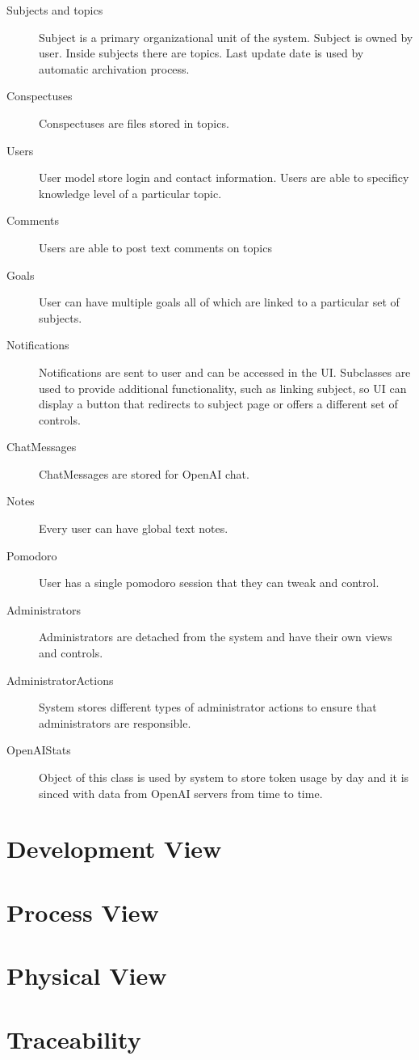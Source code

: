 \documentclass[
    english, %
]{VUMIFPSkursinis}
\begin{document}
\begin{description}
    \item[Subjects and topics] Subject is a primary organizational unit of the system. Subject is owned by user. Inside subjects there are topics. Last update date is used by automatic archivation process.
    \item[Conspectuses] Conspectuses are files stored in topics.
    \item[Users] User model store login and contact information. Users are able to specificy knowledge level of a particular topic.
    \item[Comments] Users are able to post text comments on topics
    \item[Goals] User can have multiple goals all of which are linked to a particular set of subjects.
    \item[Notifications] Notifications are sent to user and can be accessed in the UI. Subclasses are used to provide additional functionality, such as linking subject, so UI can display a button that redirects to subject page or offers a different set of controls.
    \item[ChatMessages] ChatMessages are stored for OpenAI chat.
    \item[Notes] Every user can have global text notes.
    \item[Pomodoro] User has a single pomodoro session that they can tweak and control.
    \item[Administrators] Administrators are detached from the system and have their own views and controls.
    \item[AdministratorActions] System stores different types of administrator actions to ensure that administrators are responsible.
    \item[OpenAIStats] Object of this class is used by system to store token usage by day and it is sinced with data from OpenAI servers from time to time.
\end{description}

\section{Development View}

\section{Process View}

\section{Physical View}

\section{Traceability}

\listoffigures
\printbibliography[heading=bibintoc]
\end{document}

